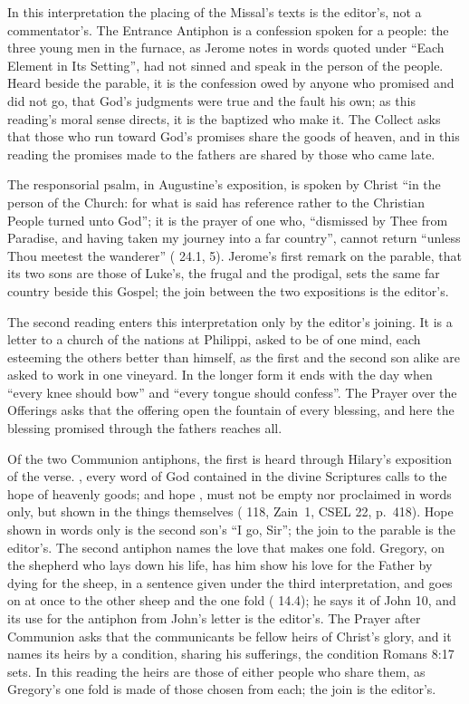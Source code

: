 In this interpretation the placing of the Missal's texts is the editor's, not a
commentator's. The Entrance
Antiphon is a confession spoken for a people: the three young men in the
furnace, as Jerome notes in words quoted under ``Each Element in Its
Setting'', had not sinned and speak in the person of the people. Heard beside
the parable, it is the confession owed
by anyone who promised and did not go, that God's judgments were true and the
fault his own; as this reading's moral sense directs, it is the baptized who
make it. The
Collect asks that those who run toward God's promises share the goods of
heaven, and in this reading the promises made to the fathers are shared by
those who came late.

The responsorial psalm, in Augustine's exposition, is spoken by Christ ``in the
person of the Church: for what is said has reference rather to the Christian
People turned unto God''; it is the prayer of one who, ``dismissed by Thee from
Paradise, and having taken my journey into a far country'', cannot return
``unless Thou meetest the wanderer'' ( 24.1, 5).
Jerome's first remark on the parable, that its two sons are those of Luke's,
the frugal and the prodigal, sets the same far country beside this Gospel; the
join between the two expositions is the editor's.

The second reading enters this interpretation only by the editor's joining. It
is a letter to a church of the nations at Philippi, asked to be of one mind,
each esteeming the others better than himself, as the first and the second
son alike are asked to work in one vineyard. In the longer form it ends with
the day when ``every knee should bow'' and ``every tongue should confess''.
The Prayer over the Offerings asks that the offering open the fountain of every
blessing, and here the blessing promised through the fathers reaches all.

Of the two Communion antiphons, the first is heard through Hilary's
exposition of the verse. , every word of God contained in
the divine Scriptures calls to the hope of heavenly goods; and hope , must not be empty nor proclaimed in words only, but shown in the
things themselves ( 118, Zain~1, CSEL 22,
p.~418). Hope shown in words only is the second son's ``I go, Sir''; the join
to the parable is the editor's. The second antiphon
names the love that makes one fold. Gregory, on the shepherd who lays down his
life, has him show his love for the Father by dying for the sheep, in a
sentence given under the third interpretation, and goes on at once to the
other sheep and the one fold ( 14.4); he says it of
John 10, and its use for the antiphon from John's letter is the editor's. The
Prayer after Communion asks that the communicants be fellow heirs of Christ's
glory, and it names its heirs by a condition, sharing his sufferings, the
condition Romans 8:17 sets. In this reading the heirs are those of either
people who share them, as Gregory's one fold is made of those chosen from
each; the join is the editor's.

